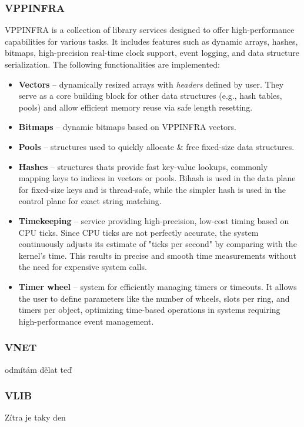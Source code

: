 \subsubsection{VPPINFRA}
VPPINFRA is a collection of library services designed to offer high-performance capabilities for various tasks. 
It includes features such as dynamic arrays, hashes, bitmaps, high-precision real-time clock support, event logging, and data structure serialization. The following functionalities are implemented:

\begin{itemize}
  \item \textbf{Vectors} -- dynamically resized arrays with \textit{headers} defined by user. They serve as a core building block for other data structures (e.g., hash tables, pools) and allow efficient memory reuse via safe length resetting.
  \item \textbf{Bitmaps} -- dynamic bitmaps based on VPPINFRA vectors.
  \item \textbf{Pools} -- structures used to quickly allocate \& free fixed-size data structures. 
  \item \textbf{Hashes} -- structures thats provide fast key-value lookups, commonly mapping keys to indices in vectors or pools. Bihash is used in the data plane for fixed-size keys and is thread-safe, while the simpler hash is used in the control plane for exact string matching.
  \item \textbf{Timekeeping} -- service providing high-precision, low-cost timing based on CPU ticks. Since CPU ticks are not perfectly accurate, the system continuously adjusts its estimate of "ticks per second" by comparing with the kernel’s time. This results in precise and smooth time measurements without the need for expensive system calls. 
  \item \textbf{Timer wheel} -- system for efficiently managing timers or timeouts. It allows the user to define parameters like the number of wheels, slots per ring, and timers per object, optimizing time-based operations in systems requiring high-performance event management.
\end{itemize}

\subsubsection{VNET}
odmítám dělat teď

\subsubsection{VLIB}
Zítra je taky den

